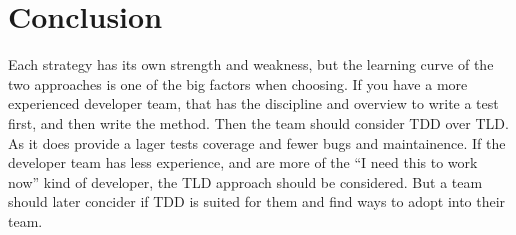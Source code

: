 \section{Conclusion}
\label{section:conclusion}

Each strategy has its own strength and weakness, 
but the learning curve of the two approaches is one of the big 
factors when choosing. If you have a more experienced developer team, 
that has the discipline and overview to write a test first, and 
then write the method. Then the team should consider TDD over TLD. As it does provide a lager tests coverage and fewer bugs and maintainence. 
If the developer team has less experience, and are more of the “I need this to work now” kind of developer, 
the TLD approach should be considered. But a team should later concider if TDD is suited for them
and find ways to adopt into their team. 